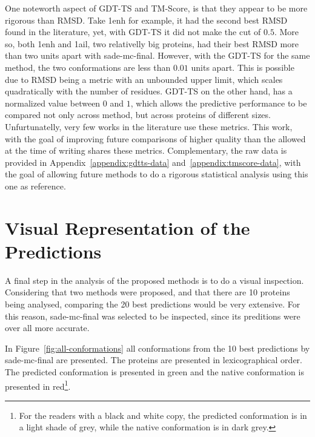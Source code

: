 One noteworth aspect of GDT-TS and TM-Score, is that they appear to be more
rigorous than RMSD. Take 1enh for example, it had the second best RMSD found
in the literature, yet, with GDT-TS it did not make the cut of $0.5$. More so,
both 1enh and 1ail, two relativelly big proteins, had their best RMSD more
than two units apart with sade-mc-final. However, with the GDT-TS for the same
method, the two conformations are less than $0.01$ units apart. This is possible
due to RMSD being a metric with an unbounded upper limit, which scales
quadratically with the number of residues. GDT-TS on the other hand, has a
normalized value between $0$ and $1$, which allows the predictive performance
to be compared not only across method, but across proteins of different sizes.
Unfurtunatelly, very few works in the literature use these metrics. This work,
with the goal of improving future comparisons of higher quality than the allowed
at the time of writing shares these metrics. Complementary, the raw data is
provided in Appendix~\ref{appendix:gdtts-data} and~\ref{appendix:tmscore-data},
with the goal of allowing future methods to do a rigorous statistical analysis
using this one as reference.

\section{Visual Representation of the Predictions}

A final step in the analysis of the proposed methods is to do a visual
inspection. Considering that two methods were proposed, and that there are 10
proteins being analysed, comparing the 20 best predictions would be very
extensive. For this reason, sade-mc-final was selected to be inspected, since
its preditions were over all more accurate.



In Figure~\ref{fig:all-conformations} all conformations from the 10 best
predictions by sade-mc-final are presented. The proteins are presented in
lexicographical order. The predicted conformation is presented in green and the
native conformation is presented in red\footnote{For the readers with a black
and white copy, the predicted conformation is in a light shade of grey, while
the native conformation is in dark grey.}.

